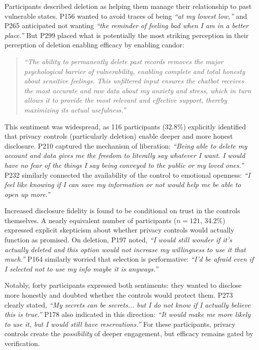 \documentclass[letterpaper,twocolumn,10pt]{article}
\begin{document}
 Participants described deletion as helping them manage their relationship to past vulnerable states. P156 wanted to avoid traces of being \textit{``at my lowest low,''} and P265 anticipated not wanting \textit{``the reminder of feeling bad when I am in a better place.''} But P299 placed what is potentially the most striking perception in their perception of deletion enabling efficacy by enabling candor:

\begin{quote}
\textit{``The ability to permanently delete past records removes the major psychological barrier of vulnerability, enabling complete and total honesty about sensitive feelings. This unfiltered input ensures the chatbot receives the most accurate and raw data about my anxiety and stress, which in turn allows it to provide the most relevant and effective support, thereby maximizing its actual usefulness.''}
\end{quote}

This sentiment was widespread, as 116 participants (32.8\%) explicitly identified that privacy controls (particularly deletion) enable deeper and more honest disclosure. P210 captured the mechanism of liberation: \textit{``Being able to delete my account and data gives me the freedom to literally say whatever I want. I would have no fear of the things I say being conveyed to the public or my loved ones.''} P232 similarly connected the availability of the control to emotional openness: \textit{``I feel like knowing if I can save my information or not would help me be able to open up more.''}

 Increased disclosure fidelity is found to be conditional on trust in the controls themselves. A nearly equivalent number of participants ($n=121$, 34.2\%) expressed explicit skepticism about whether privacy controls would actually function as promised. On deletion, P197 noted, \textit{``I would still wonder if it's actually deleted and this option would not increase my willingness to use it that much.''} P164 similarly worried that selection is performative: \textit{``I'd be afraid even if I selected not to use my info maybe it is anyways.''}

Notably, forty participants expressed both sentiments: they wanted to disclose more honestly and doubted whether the controls would protect them. P273 clearly stated, \textit{``My secrets can be secrets... but I do not know if I actually believe this is true.''} P178 also indicated in this direction: \textit{``It would make me more likely to use it, but I would still have reservations.''} For these participants, privacy controls create the \textit{possibility} of deeper engagement, but efficacy remains gated by verification.
\end{document}
